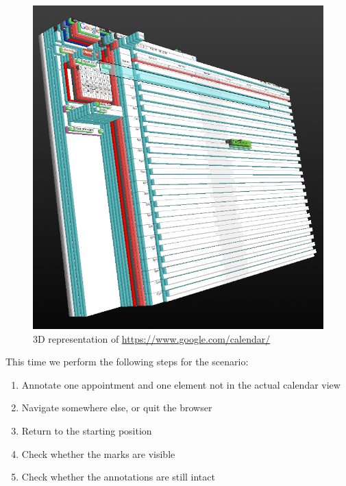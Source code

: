 \begin{figure}\centering
		\includegraphics[width=13cm]{images/3d-gcal.png}
		\caption{3D representation of \url{https://www.google.com/calendar/}}
		\label{3d-gcal}
\end{figure} 

This time we perform the following steps for the scenario:

\begin{enumerate}
\item Annotate one appointment and one element not in the actual calendar view
\item Navigate somewhere else, or quit the browser
\item Return to the starting position
\item Check whether the marks are visible
\item Check whether the annotations are still intact
\end{enumerate}


